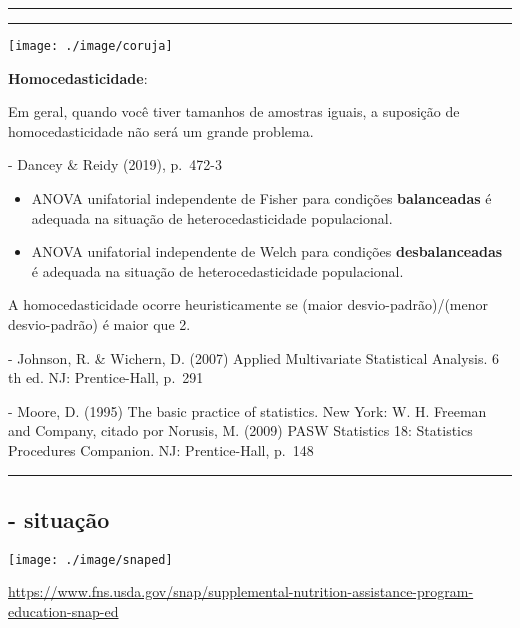 \documentclass[]{article}
\providecommand{\tightlist}{%
  \setlength{\itemsep}{0pt}\setlength{\parskip}{0pt}}
\begin{document}
\begin{center}\rule{0.5\linewidth}{\linethickness}\end{center}

\begin{center}\rule{0.5\linewidth}{\linethickness}\end{center}

\begin{flushleft}\texttt{[image: ./image/coruja]} \end{flushleft}

\textbf{Homocedasticidade}:

Em geral, quando você tiver tamanhos de amostras iguais, a suposição de
homocedasticidade não será um grande problema.

- Dancey \& Reidy (2019), p.~472-3

\begin{itemize}
\tightlist
\item
  ANOVA unifatorial independente de Fisher para condições
  \textbf{balanceadas} é adequada na situação de heterocedasticidade
  populacional.
\item
  ANOVA unifatorial independente de Welch para condições
  \textbf{desbalanceadas} é adequada na situação de heterocedasticidade
  populacional.
\end{itemize}

A homocedasticidade ocorre heuristicamente se (maior
desvio-padrão)/(menor desvio-padrão) é maior que 2.

- Johnson, R. \& Wichern, D. (2007) Applied Multivariate Statistical
Analysis. 6 th ed. NJ: Prentice-Hall, p.~291

- Moore, D. (1995) The basic practice of statistics. New York: W. H.
Freeman and Company, citado por Norusis, M. (2009) PASW Statistics 18:
Statistics Procedures Companion. NJ: Prentice-Hall, p.~148

\begin{center}\rule{0.5\linewidth}{\linethickness}\end{center}

\subsection{- situação}\label{situacao}

\begin{flushleft}\texttt{[image: ./image/snaped]} \end{flushleft}

\url{https://www.fns.usda.gov/snap/supplemental-nutrition-assistance-program-education-snap-ed}
\end{document}
